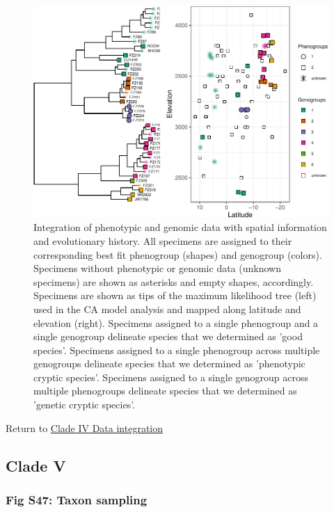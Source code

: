 \documentclass[
  11pt,
]{article}
\begin{document}
\begin{figure}
\includegraphics{Supplementary_Material_files/figure-latex/cladeIVfinalDelimitation2-1} \caption{Integration of phenotypic and genomic data with spatial information and evolutionary history. All specimens are assigned to their corresponding best fit phenogroup (shapes) and genogroup (colors). Specimens without phenotypic or genomic data (unknown specimens) are shown as asterisks and empty shapes, accordingly. Specimens are shown as tips of the maximum likelihood tree (left) used in the CA model analysis and mapped along latitude and elevation (right). Specimens assigned to a single phenogroup and a single genogroup delineate species that we determined as 'good species'. Specimens assigned to a single phenogroup across multiple genogroups delineate species that we determined as 'phenotypic cryptic species'. Specimens assigned to a single genogroup across multiple phenogroups delineate species that we determined as 'genetic cryptic species'.}\label{fig:cladeIVfinalDelimitation2}
\end{figure}

Return to \protect\hyperlink{data-integration-4}{Clade IV Data integration}
\pagebreak

\hypertarget{clade-v-2}{%
\subsection{Clade V}\label{clade-v-2}}

\hypertarget{fig-s47-taxon-sampling}{%
\subsubsection{Fig S47: Taxon sampling}\label{fig-s47-taxon-sampling}}
\end{document}
